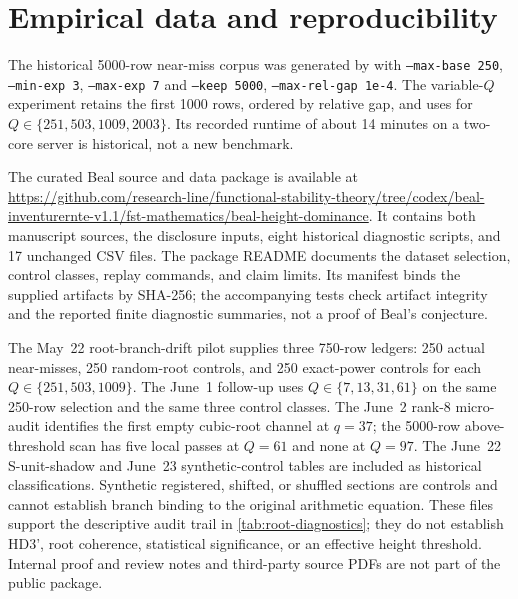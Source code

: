 \documentclass[11pt,a4paper]{article}
\begin{document}
\appendix

\section{Empirical data and reproducibility}
\label{app:data}

The historical 5000-row near-miss corpus was generated by
 with
\texttt{--max-base 250}, \texttt{--min-exp 3}, \texttt{--max-exp 7} and
\texttt{--keep 5000}, \texttt{--max-rel-gap 1e-4}. The variable-$Q$ experiment
retains the first 1000 rows, ordered by relative gap, and uses
 for
$Q\in\{251,503,1009,2003\}$. Its recorded runtime of about 14 minutes
on a two-core server is historical, not a new benchmark.

The curated Beal source and data package is available at
\url{https://github.com/research-line/functional-stability-theory/tree/codex/beal-inventurernte-v1.1/fst-mathematics/beal-height-dominance}.
It contains both manuscript sources, the disclosure inputs, eight
historical diagnostic scripts, and 17 unchanged CSV files. The package
README documents the dataset selection, control classes, replay commands,
and claim limits. Its manifest binds the supplied artifacts by SHA-256;
the accompanying tests check artifact integrity and the reported finite
diagnostic summaries, not a proof of Beal's conjecture.

The May~22 root-branch-drift pilot supplies three 750-row ledgers:
250 actual near-misses, 250 random-root controls, and 250 exact-power
controls for each $Q\in\{251,503,1009\}$. The June~1 follow-up uses
$Q\in\{7,13,31,61\}$ on the same 250-row selection and the same three
control classes. The June~2 rank-8 micro-audit identifies the first
empty cubic-root channel at $q=37$; the 5000-row above-threshold scan
has five local passes at $Q=61$ and none at $Q=97$.
The June~22 S-unit-shadow and June~23 synthetic-control tables are
included as historical classifications. Synthetic registered, shifted,
or shuffled sections are controls and cannot establish branch binding
to the original arithmetic equation.
These files support the descriptive audit trail in
\cref{tab:root-diagnostics}; they do not establish HD3', root coherence,
statistical significance, or an effective height threshold. Internal
proof and review notes and third-party source PDFs are not part of
the public package.


\end{document}
